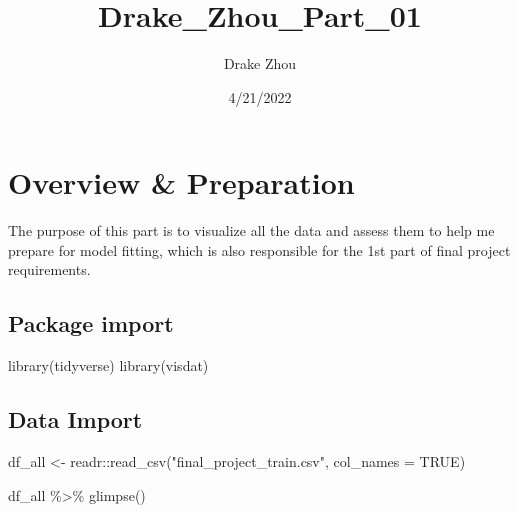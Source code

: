 \documentclass[
]{article}
\title{Drake\_Zhou\_Part\_01}
\author{Drake Zhou}
\date{4/21/2022}
\newenvironment{Shaded}{\begin{snugshade}}{\end{snugshade}}
\newcommand{\AttributeTok}[1]{\textcolor[rgb]{0.77,0.63,0.00}{#1}}
\newcommand{\ConstantTok}[1]{\textcolor[rgb]{0.00,0.00,0.00}{#1}}
\newcommand{\FunctionTok}[1]{\textcolor[rgb]{0.00,0.00,0.00}{#1}}
\newcommand{\NormalTok}[1]{#1}
\newcommand{\OtherTok}[1]{\textcolor[rgb]{0.56,0.35,0.01}{#1}}
\newcommand{\SpecialCharTok}[1]{\textcolor[rgb]{0.00,0.00,0.00}{#1}}
\newcommand{\StringTok}[1]{\textcolor[rgb]{0.31,0.60,0.02}{#1}}
\begin{document}
\maketitle

{
\setcounter{tocdepth}{2}
\tableofcontents
}
\hypertarget{overview-preparation}{%
\section{Overview \& Preparation}\label{overview-preparation}}

The purpose of this part is to visualize all the data and assess them to
help me prepare for model fitting, which is also responsible for the 1st
part of final project requirements.

\hypertarget{package-import}{%
\subsection{Package import}\label{package-import}}

\begin{Shaded}
\begin{Highlighting}[]
\FunctionTok{library}\NormalTok{(tidyverse)}
\FunctionTok{library}\NormalTok{(visdat)}
\end{Highlighting}
\end{Shaded}

\hypertarget{data-import}{%
\subsection{Data Import}\label{data-import}}

\begin{Shaded}
\begin{Highlighting}[]
\NormalTok{df\_all }\OtherTok{\textless{}{-}}\NormalTok{ readr}\SpecialCharTok{::}\FunctionTok{read\_csv}\NormalTok{(}\StringTok{"final\_project\_train.csv"}\NormalTok{, }\AttributeTok{col\_names =} \ConstantTok{TRUE}\NormalTok{)}

\NormalTok{df\_all }\SpecialCharTok{\%\textgreater{}\%} \FunctionTok{glimpse}\NormalTok{()}
\end{Highlighting}
\end{Shaded}
\end{document}
